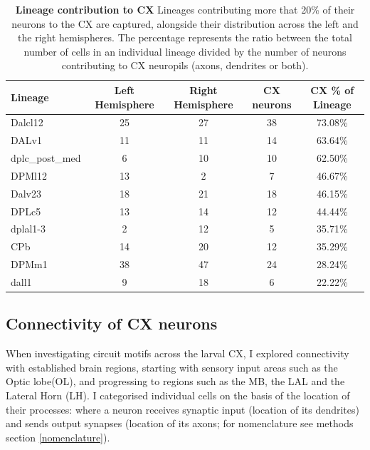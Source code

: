     \begin{table} [!htbp]
    \centering
    \begin{tabular}{|l|c|c|c|c|}
    \hline
    \textbf{Lineage} & \textbf{Left Hemisphere} & \textbf{Right Hemisphere} & \textbf{CX neurons} & \textbf{CX \% of Lineage} \\
    \hline
    Dalcl12 & 25 & 27 & 38 & \cellcolor{forest5}73.08\% \\
    DALv1 & 11 & 11 & 14 & \cellcolor{forest4}63.64\% \\
    dplc\_post\_med & 6 & 10 & 10 & \cellcolor{forest4}62.50\% \\
    DPMl12 & 13 & 2 & 7 & \cellcolor{forest3}46.67\% \\
    Dalv23 & 18 & 21 & 18 & \cellcolor{forest3}46.15\% \\
    DPLc5 & 13 & 14 & 12 & \cellcolor{forest3}44.44\% \\
    dplal1-3 & 2 & 12 & 5 & \cellcolor{forest2}35.71\% \\
    CPb & 14 & 20 & 12 & \cellcolor{forest2}35.29\% \\
    DPMm1 & 38 & 47 & 24 & \cellcolor{forest1}28.24\% \\
    dall1 & 9 & 18 & 6 & \cellcolor{forest1}22.22\% \\
    \hline
    \end{tabular}
    \caption[Contribution of lineages to CX]{\textbf{Lineage contribution to CX}  Lineages contributing more that 20\% of their neurons to the CX are captured, alongside their distribution across the left and the right hemispheres. The percentage represents the ratio between the total number of cells in an individual lineage divided by the number of neurons contributing to CX neuropils (axons, dendrites or both). }
    \label{cx_percentage}
        \end{table}

    \subsection{Connectivity of CX neurons}
    When investigating circuit motifs across the larval CX, I explored connectivity with established brain regions, starting with sensory input areas such as the Optic lobe(OL), and progressing to regions such as the MB, the LAL and the Lateral Horn (LH).  I categorised individual cells on the basis of the location of their processes: where a neuron receives synaptic input (location of its dendrites) and sends output synapses (location of its axons; for nomenclature see methods section \ref{nomenclature}).


